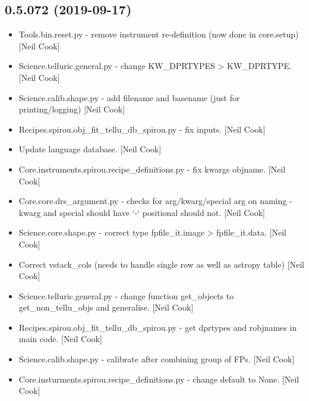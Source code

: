 \documentclass[a4paper,10pt,english]{report}
\begin{document}
\subsection{0.5.072 (2019-09-17)}
\label{\detokenize{misc/changelog:id69}}\begin{itemize}
\item {} 
Tools.bin.reset.py - remove instrument re-definition (now done in
core.setup) {[}Neil Cook{]}

\item {} 
Science.telluric.general.py - change KW\_DPRTYPES \textendash{}\textgreater{} KW\_DPRTYPE. {[}Neil
Cook{]}

\item {} 
Science.calib.shape.py - add filename and basename (just for
printing/logging) {[}Neil Cook{]}

\item {} 
Recipes.spirou.obj\_fit\_tellu\_db\_spirou.py - fix inputs. {[}Neil Cook{]}

\item {} 
Update language database. {[}Neil Cook{]}

\item {} 
Core.instruments.spirou.recipe\_definitions.py - fix kwargs \textendash{}objname.
{[}Neil Cook{]}

\item {} 
Core.core.drs\_argument.py - checks for arg/kwarg/special arg on naming
- kwarg and special should have ‘-‘ positional should not. {[}Neil Cook{]}

\item {} 
Science.core.shape.py - correct type fpfile\_it.image \textendash{}\textgreater{}
fpfile\_it.data. {[}Neil Cook{]}

\item {} 
Correct vstack\_cols (needs to handle single row as well as astropy
table) {[}Neil Cook{]}

\item {} 
Science.telluric.general.py - change function get\_objects to
get\_non\_tellu\_objs and generalise. {[}Neil Cook{]}

\item {} 
Recipes.spirou.obj\_fit\_tellu\_db\_spirou.py - get dprtypes and robjnames
in main code. {[}Neil Cook{]}

\item {} 
Science.calib.shape.py - calibrate after combining group of FPs. {[}Neil
Cook{]}

\item {} 
Core.insturments.spirou.recipe\_definitions.py - change default to
None. {[}Neil Cook{]}


\end{itemize}
\end{document}
